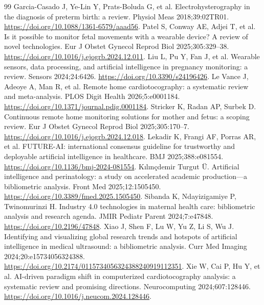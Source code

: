 \begin{thebibliography}{99}
 Garcia-Casado J, Ye-Lin Y, Prats-Boluda G, et al. Electrohysterography in the diagnosis of preterm birth: a review. Physiol Meas 2018;39:02TR01. \href{https://doi.org/10.1088/1361-6579/aaad56}{https://doi.org/10.1088/1361-6579/aaad56}.
 Patel S, Conway AE, Adjei T, et al. Is it possible to monitor fetal movements with a wearable device? A review of novel technologies. Eur J Obstet Gynecol Reprod Biol 2025;305:329--38. \href{https://doi.org/10.1016/j.ejogrb.2024.12.011}{https://doi.org/10.1016/j.ejogrb.2024.12.011}.
 Liu L, Pu Y, Fan J, et al. Wearable sensors, data processing, and artificial intelligence in pregnancy monitoring: a review. Sensors 2024;24:6426. \href{https://doi.org/10.3390/s24196426}{https://doi.org/10.3390/s24196426}.
 Le Vance J, Adeoye A, Man R, et al. Remote home cardiotocography: a systematic review and meta-analysis. PLOS Digit Health 2026;5:e0001184. \href{https://doi.org/10.1371/journal.pdig.0001184}{https://doi.org/10.1371/journal.pdig.0001184}.
 Stricker K, Radan AP, Surbek D. Continuous remote home monitoring solutions for mother and fetus: a scoping review. Eur J Obstet Gynecol Reprod Biol 2025;305:170--7. \href{https://doi.org/10.1016/j.ejogrb.2024.12.018}{https://doi.org/10.1016/j.ejogrb.2024.12.018}.
 Lekadir K, Frangi AF, Porras AR, et al. FUTURE-AI: international consensus guideline for trustworthy and deployable artificial intelligence in healthcare. BMJ 2025;388:e081554. \href{https://doi.org/10.1136/bmj-2024-081554}{https://doi.org/10.1136/bmj-2024-081554}.
 Kılınçdemir Turgut Ü. Artificial intelligence and perinatology: a study on accelerated academic production---a bibliometric analysis. Front Med 2025;12:1505450. \href{https://doi.org/10.3389/fmed.2025.1505450}{https://doi.org/10.3389/fmed.2025.1505450}.
 Sibanda K, Ndayizigamiye P, Twinomurinzi H. Industry 4.0 technologies in maternal health care: bibliometric analysis and research agenda. JMIR Pediatr Parent 2024;7:e47848. \href{https://doi.org/10.2196/47848}{https://doi.org/10.2196/47848}.
 Xiao J, Shen F, Lu W, Yu Z, Li S, Wu J. Identifying and visualizing global research trends and hotspots of artificial intelligence in medical ultrasound: a bibliometric analysis. Curr Med Imaging 2024;20:e15734056324388. \href{https://doi.org/10.2174/0115734056324388240919112351}{https://doi.org/10.2174/0115734056324388240919112351}.
 Xie W, Cai P, Hu Y, et al. AI-driven paradigm shift in computerized cardiotocography analysis: a systematic review and promising directions. Neurocomputing 2024;607:128446. \href{https://doi.org/10.1016/j.neucom.2024.128446}{https://doi.org/10.1016/j.neucom.2024.128446}.

\end{thebibliography}
